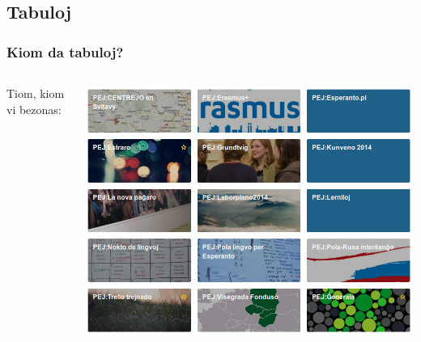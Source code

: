  
\subsection{Tabuloj}


  \begin{frame}
    \frametitle{Kiom da tabuloj?}

	\begin{columns}
	
		Tiom, kiom vi bezonas:
	
    
    \includegraphics[scale=0.3]{ekranoj/tabuloj}
	
	\end{columns}
	
	
	
  \end{frame}


